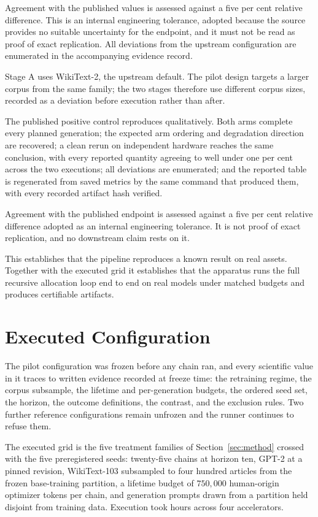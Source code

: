 Agreement with the published values is assessed against a five per cent relative difference.
This is an internal engineering tolerance, adopted because the source provides no suitable
uncertainty for the endpoint, and it must not be read as proof of exact replication. All
deviations from the upstream configuration are enumerated in the accompanying evidence
record.

Stage A uses WikiText-2, the upstream default. The pilot design targets a larger corpus
from the same family; the two stages therefore use different corpus sizes, recorded as a
deviation before execution rather than after.

The published positive control reproduces qualitatively. Both arms complete every planned
generation; the expected arm ordering and degradation direction are recovered; a clean
rerun on independent hardware reaches the same conclusion, with every reported quantity
agreeing to well under one per cent across the two executions; all deviations are
enumerated; and the reported table is regenerated from saved metrics by the same command
that produced them, with every recorded artifact hash verified.

Agreement with the published endpoint is assessed against a five per cent relative
difference adopted as an internal engineering tolerance. It is not proof of exact
replication, and no downstream claim rests on it.

This establishes that the pipeline reproduces a known result on real assets. Together with
the executed grid it establishes that the apparatus runs the full recursive allocation loop
end to end on real models under matched budgets and produces certifiable artifacts.

\section{Executed Configuration}
\label{app:config}

The pilot configuration was frozen before any chain ran, and every scientific value in it
traces to written evidence recorded at freeze time: the retraining regime, the corpus
subsample, the lifetime and per-generation budgets, the ordered seed set, the horizon, the
outcome definitions, the contrast, and the exclusion rules. Two further reference
configurations remain unfrozen and the runner continues to refuse them.

The executed grid is the five treatment families of Section~\ref{sec:method} crossed with
the five preregistered seeds: twenty-five chains at horizon ten, GPT-2 at a pinned
revision, WikiText-103 subsampled to four hundred articles from the frozen base-training
partition, a lifetime budget of $750{,}000$ human-origin optimizer tokens per chain, and
generation prompts drawn from a partition held disjoint from training data. Execution took
\PilotWallHours{} hours across four accelerators.

